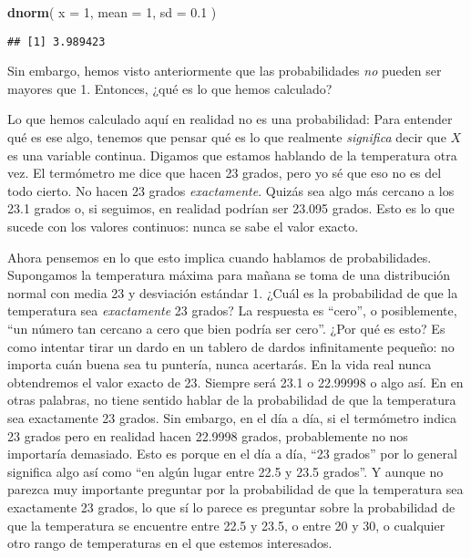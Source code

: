 \documentclass[spanish,]{book}
\newenvironment{Shaded}{\begin{snugshade}}{\end{snugshade}}
\newcommand{\KeywordTok}[1]{\textcolor[rgb]{0.13,0.29,0.53}{\textbf{#1}}}
\newcommand{\DataTypeTok}[1]{\textcolor[rgb]{0.13,0.29,0.53}{#1}}
\newcommand{\DecValTok}[1]{\textcolor[rgb]{0.00,0.00,0.81}{#1}}
\newcommand{\FloatTok}[1]{\textcolor[rgb]{0.00,0.00,0.81}{#1}}
\newcommand{\NormalTok}[1]{#1}
\begin{document}
\begin{Shaded}
\begin{Highlighting}[]
\KeywordTok{dnorm}\NormalTok{( }\DataTypeTok{x =} \DecValTok{1}\NormalTok{, }\DataTypeTok{mean =} \DecValTok{1}\NormalTok{, }\DataTypeTok{sd =} \FloatTok{0.1}\NormalTok{ )}
\end{Highlighting}
\end{Shaded}

\begin{verbatim}
## [1] 3.989423
\end{verbatim}

Sin embargo, hemos visto anteriormente que las probabilidades \emph{no}
pueden ser mayores que 1. Entonces, ¿qué es lo que hemos calculado?

Lo que hemos calculado aquí en realidad no es una probabilidad: Para
entender qué es ese algo, tenemos que pensar qué es lo que realmente
\emph{significa} decir que \(X\) es una variable continua. Digamos que
estamos hablando de la temperatura otra vez. El termómetro me dice que
hacen 23 grados, pero yo sé que eso no es del todo cierto. No hacen 23
grados \emph{exactamente}. Quizás sea algo más cercano a los 23.1 grados
o, si seguimos, en realidad podrían ser 23.095 grados. Esto es lo que
sucede con los valores continuos: nunca se sabe el valor exacto.

Ahora pensemos en lo que esto implica cuando hablamos de probabilidades.
Supongamos la temperatura máxima para mañana se toma de una distribución
normal con media 23 y desviación estándar 1. ¿Cuál es la probabilidad de
que la temperatura sea \emph{exactamente} 23 grados? La respuesta es
``cero'', o posiblemente, ``un número tan cercano a cero que bien podría
ser cero''. ¿Por qué es esto? Es como intentar tirar un dardo en un
tablero de dardos infinitamente pequeño: no importa cuán buena sea tu
puntería, nunca acertarás. En la vida real nunca obtendremos el valor
exacto de 23. Siempre será 23.1 o 22.99998 o algo así. En en otras
palabras, no tiene sentido hablar de la probabilidad de que la
temperatura sea exactamente 23 grados. Sin embargo, en el día a día, si
el termómetro indica 23 grados pero en realidad hacen 22.9998 grados,
probablemente no nos importaría demasiado. Esto es porque en el día a
día, ``23 grados'' por lo general significa algo así como ``en algún
lugar entre 22.5 y 23.5 grados''. Y aunque no parezca muy importante
preguntar por la probabilidad de que la temperatura sea exactamente 23
grados, lo que sí lo parece es preguntar sobre la probabilidad de que la
temperatura se encuentre entre 22.5 y 23.5, o entre 20 y 30, o cualquier
otro rango de temperaturas en el que estemos interesados.
\end{document}
